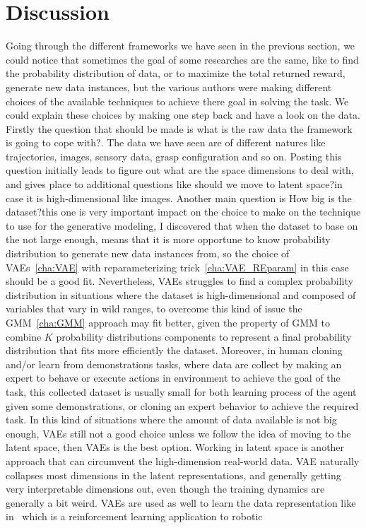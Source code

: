 

\pagestyle{fancy} 
\chapter{Discussion}
\label{cha:3}
\vspace{1cm}

Going through the different frameworks we have seen in the previous section, we could notice that sometimes the goal of some researches are the same, like to find the probability distribution of data, or to maximize the total returned reward, generate new data instances, but the various authors were making different choices of the available techniques to achieve there goal in solving the task. We could explain these choices by making one step back and have a look on the data. Firstly the question that should be made is \textacutedbl what is the raw data the framework is going to cope with?\textgravedbl. The data we have seen are of different natures like trajectories, images, sensory data, grasp configuration and so on. Posting this question initially leads to figure out what are the space dimensions to deal with, and gives place to additional questions like \textacutedbl should we move to latent space?\textgravedbl in case it is high-dimensional like images. Another main question is \textacutedbl How big is the dataset?\textgravedbl this one is very important impact on the choice to make on the technique to use for the generative modeling, I discovered that when the dataset to base on the not large enough, means that it is more opportune to know probability distribution to generate new data instances from, so the choice of VAEs~\ref{cha:VAE} with reparameterizing trick~\ref{cha:VAE_REparam} in this case should be a good fit. Nevertheless, VAEs struggles to find a complex probability distribution in situations where the dataset is high-dimensional and composed of variables that vary in wild ranges, to overcome this kind of issue the GMM~\ref{cha:GMM} approach may fit better, given the property of GMM to combine $K$ probability distributions components to represent a final probability distribution that fits more efficiently the dataset. Moreover, in human cloning and/or learn from demonstrations tasks, where data are collect by making an expert to behave or execute actions in environment to achieve the goal of the task, this collected dataset is usually small for both learning process of the agent given some demonstrations, or cloning an expert behavior to achieve the required task. In this kind of situations where the amount of data available is not big enough, VAEs still not a good choice unless we follow the idea of moving to the latent space, then VAEs is the best option. Working in latent space is another approach that can circumvent the high-dimension real-world data. VAE naturally collapses most dimensions in the latent representations, and generally getting very interpretable dimensions out, even though the training dynamics are generally a bit weird. VAEs are used as well to learn the data representation like in~\cite{finn2016deep} which is a reinforcement learning application to robotic 